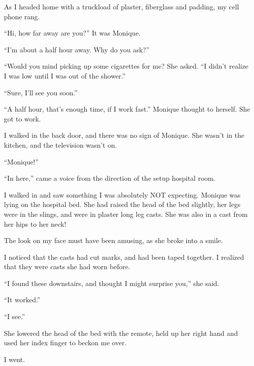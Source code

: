 As I headed home with a truckload of plaster, fiberglass and padding, my cell phone rang.

``Hi, how far away are you?'' It was Monique.

``I'm about a half hour away. Why do you ask?''

``Would you mind picking up some cigarettes for me? She asked. ``I didn't realize I was low
until I was out of the shower.''

``Sure, I'll see you soon.''

\begin{thought}
``A half hour, that's enough time, if I work fast.'' Monique thought to herself. She got to
work.
\end{thought}

I walked in the back door, and there was no sign of Monique. She wasn't in the kitchen, and
the television wasn't on.

``Monique!''

``In here,'' came a voice from the direction of the setup hospital room.

I walked in and saw something I was absolutely NOT expecting. Monique was lying on the
hospital bed. She had raised the head of the bed slightly, her legs were in the slings, and were
in plaster long leg casts. She was also in a cast from her hips to her neck!

The look on my face must have been amusing, as she broke into a smile.

I noticed that the casts had cut marks, and had been taped together. I realized that they
were casts she had worn before.

``I found these downstairs, and thought I might surprise you,'' she said.

``It worked.''

``I see.''

She lowered the head of the bed with the remote, held up her right hand and used her index
finger to beckon me over.

I went.

